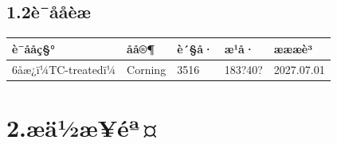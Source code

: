 \documentclass[UTF8,10pt,a4paper,fontset=fandol]{ctexart}
\newcommand{\fieldvalue}[1]{#1}
\newcommand{\handwritten}[1]{#1}
\begin{document}
\subsection*{1.2\quad è¯ååèæ}

\begin{center}
\begin{tabular}{|p{5cm}|p{3cm}|p{3cm}|p{3cm}|p{3cm}|}
\hline
è¯ååç§° & åå®¶ & è´§å· & æ¹å· & æææè³\\
\hline
\fieldvalue{6å­æ¿ï¼TC-treatedï¼} &
\fieldvalue{Corning} &
\fieldvalue{3516} &
\fieldvalue{\handwritten{183?40?}} &
\fieldvalue{\handwritten{2027.07.01}}\\
\hline
\end{tabular}
\end{center}

\section*{2.\quad æä½æ­¥éª¤}
\end{document}
